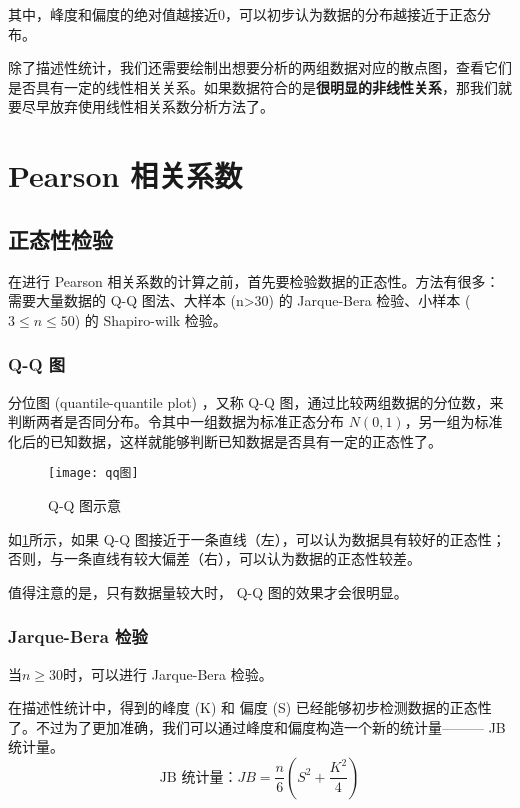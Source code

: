 \documentclass[withoutpreface]{cumcmthesis}
\begin{document}
其中，峰度和偏度的绝对值越接近0，可以初步认为数据的分布越接近于正态分布。

除了描述性统计，我们还需要绘制出想要分析的两组数据对应的散点图，查看它们是否具有一定的线性相关关系。如果数据符合的是\textbf{很明显的非线性关系}，那我们就要尽早放弃使用线性相关系数分析方法了。

\section{Pearson 相关系数}
\subsection{正态性检验}
在进行 Pearson 相关系数的计算之前，首先要检验数据的正态性。方法有很多：需要大量数据的 Q-Q 图法、大样本 (n>30) 的 Jarque-Bera 检验、小样本 ($3 \le n \le 50$) 的 Shapiro-wilk 检验。

\subsubsection{Q-Q 图}

分位图 (quantile-quantile plot) ，又称 Q-Q 图，通过比较两组数据的分位数，来判断两者是否同分布。令其中一组数据为标准正态分布 $N(0,1)$，另一组为标准化后的已知数据，这样就能够判断已知数据是否具有一定的正态性了。

\begin{figure}[H]
    \centering
    \texttt{[image: qq图]}
    \caption{Q-Q 图示意}\label{Fig:2}
\end{figure}

如\cref{Fig:2}所示，如果 Q-Q 图接近于一条直线（左），可以认为数据具有较好的正态性；否则，与一条直线有较大偏差（右），可以认为数据的正态性较差。

值得注意的是，只有数据量较大时， Q-Q 图的效果才会很明显。

\subsubsection{Jarque-Bera 检验}

当$n\ge 30$时，可以进行 Jarque-Bera 检验。

在描述性统计中，得到的峰度 (K) 和 偏度 (S) 已经能够初步检测数据的正态性了。不过为了更加准确，我们可以通过峰度和偏度构造一个新的统计量——— JB 统计量。
\begin{equation}\label{Eq:1}
    \mbox{JB 统计量：}  JB = \frac{n}{6}(S^2+\frac{K^2}{4})
\end{equation}
\end{document}
